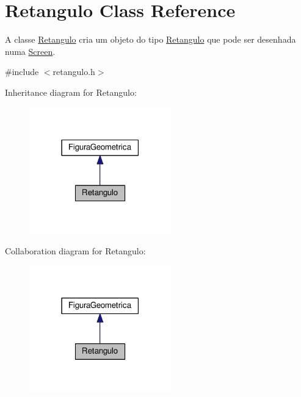 \hypertarget{class_retangulo}{}\section{Retangulo Class Reference}
\label{class_retangulo}


A classe \hyperlink{class_retangulo}{Retangulo} cria um objeto do tipo \hyperlink{class_retangulo}{Retangulo} que pode ser desenhada numa \hyperlink{class_screen}{Screen}.  




{\ttfamily \#include $<$retangulo.\+h$>$}



Inheritance diagram for Retangulo\+:
\nopagebreak
\begin{figure}[H]
\begin{center}
\leavevmode
\includegraphics[width=174pt]{class_retangulo__inherit__graph}
\end{center}
\end{figure}


Collaboration diagram for Retangulo\+:
\nopagebreak
\begin{figure}[H]
\begin{center}
\leavevmode
\includegraphics[width=174pt]{class_retangulo__coll__graph}
\end{center}
\end{figure}
